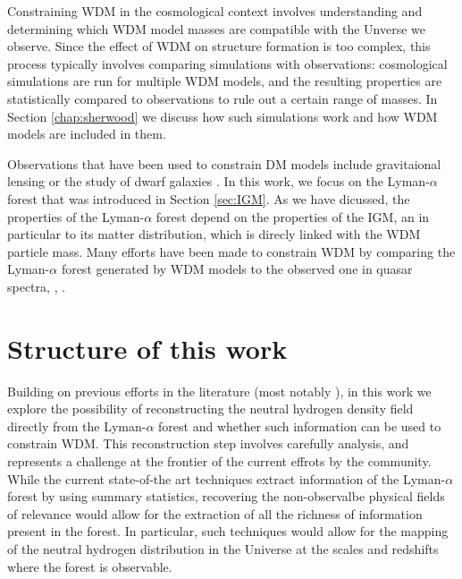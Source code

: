 Constraining WDM in the cosmological context involves understanding and determining which WDM model masses are compatible with the Unverse we observe. Since the effect of WDM on structure formation is too complex, this process typically involves comparing simulations with observations: cosmological simulations are run for multiple WDM models, and the resulting properties are statistically compared to observations to rule out a certain range of masses. In Section \ref{chap:sherwood} we discuss how such simulations work and how WDM models are included in them.

Observations that have been used to constrain DM models include gravitaional lensing \cite{Massey_2010} or the study of dwarf galaxies \cite{Calore_2018}. In this work, we focus on the Lyman-$\alpha$ forest that was introduced in Section \ref{sec:IGM}. As we have dicussed, the properties of the Lyman-$\alpha$ forest depend on the properties of the IGM, an in particular to its matter distribution, which is direcly linked with the WDM particle mass. Many efforts have been made to constrain WDM by comparing the Lyman-$\alpha$ forest generated by WDM models to the observed one in quasar spectra\cite{sherwood_wdm}, \cite{Villasenor_2023}, \cite{Viel_2005}.

\section{Structure of this work}
Building on previous efforts in the literature (most notably \cite{nasir2024deep}), in this work we explore the possibility of reconstructing the neutral hydrogen density field directly from the Lyman-$\alpha$ forest and whether such information can be used to constrain WDM. This reconstruction step involves carefully analysis, and represents a challenge at the frontier of the current effrots by the community. While the current state-of-the art techniques extract information of the Lyman-$\alpha$ forest by using summary statistics, recovering the
non-observalbe physical fields of relevance would allow for the extraction of all the richness of information present in the forest. In particular, such techniques would allow for the mapping of the neutral hydrogen distribution in the Universe at the scales and redshifts where the forest is observable.

